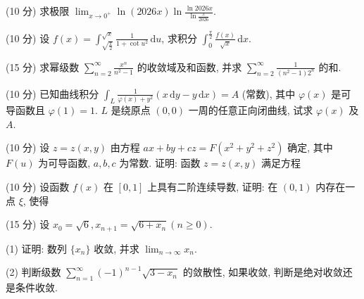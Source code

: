 (10 分) 求极限 $\lim_{x\to 0^{+}}\ln (2026x)\ln \frac{\ln 2026x}{\ln\frac{x}{2026}}.$\par
(10 分) 设 $f(x) = \int_{\sqrt{\frac{\pi}{2}}}^{\sqrt{x}} \frac{1}{1 + \cot u^2} \, \mathrm{d}u$, 求积分 $\int_0^{\frac{\pi}{2}} \frac{f(x)}{\sqrt{x}} \, \mathrm{d}x$.\par
(15 分) 求幂级数 $\sum_{n=2}^{\infty} \frac{x^n}{n^2 - 1}$ 的收敛域及和函数, 并求 $\sum_{n=2}^{\infty} \frac{1}{(n^2 - 1)2^n}$ 的和.\par
(10 分) 已知曲线积分 $\int_{L} \frac{1}{\varphi(x) + y^2} (x \, \mathrm{d}y - y \, \mathrm{d}x) = A$ (常数), 其中 $\varphi(x)$ 是可导函数且 $\varphi(1) = 1$. $L$ 是绕原点 $(0,0)$ 一周的任意正向闭曲线, 试求 $\varphi(x)$ 及 $A$.\par
\par{}
(10 分) 设 $z = z(x, y)$ 由方程 $ax + by + cz = F(x^2 + y^2 + z^2)$ 确定, 其中 $F(u)$ 为可导函数, $a, b, c$ 为常数. 证明: 函数 $z = z(x, y)$ 满足方程\par
\nopagebreak[4]
\par{}
(10 分) 设函数 $f(x)$ 在 $[0,1]$ 上具有二阶连续导数, 证明: 在 $(0,1)$ 内存在一点 $\xi$, 使得\par
\nopagebreak[4]
(15 分) 设 $x_0 = \sqrt{6}, x_{n+1} = \sqrt{6 + x_n} (n \geq 0)$.\par
(1) 证明: 数列 $\{x_{n}\}$ 收敛, 并求 $\lim_{n\to \infty}x_n$.\par
(2) 判断级数 $\sum_{n=1}^{\infty} (-1)^{n-1} \sqrt{3 - x_n}$ 的敛散性, 如果收敛, 判断是绝对收敛还是条件收敛.\par

